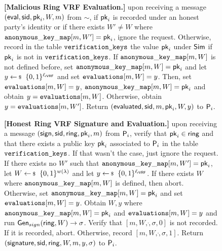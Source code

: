 \begin{figure}
\begin{tcolorbox}[left=2pt,right=2pt]
{			\textbf{[Malicious Ring VRF Evaluation.]} upon receiving a message $(\mathsf{eval}, \textsf{sid}, \mathsf{pk}_i, W, m)$ from $\sim$, if $ \mathsf{pk}_i $ is recorded under an honest party's identity or if there exists $ W'\neq W $ where $ \mathtt{anonymous\_key\_map}[m,W'] = \mathsf{pk}_i $, ignore the request.
			Otherwise, record in the table $\texttt{verification\_keys}$ the value $\mathsf{pk}_i$ under $\mathsf{Sim}$ if $ \mathsf{pk}_i $ is not in $ \texttt{verification\_keys} $. If  $\mathtt{anonymous\_key\_map}[m,W]  $ is not defined before, set $ \mathtt{anonymous\_key\_map}[m,W] = \mathsf{pk}_i $ and let   $y \leftsample \bin^{\ell_\rVRF}$ and set $ \texttt{evaluations}[m, W] = y$.
			Then, set $ \texttt{evaluations}[m, W] = y$, $ \mathtt{anonymous\_key\_map}[m,W] = \mathsf{pk}_i $ and obtain $ y =  \texttt{evaluations}[m, W]$. Otherwise, obtain $ y = \texttt{evaluations}[m, W'] $.
			Return $(\mathsf{evaluated}, \textsf{sid},  m, \mathsf{pk}_i,W, y)$ to $ \mathsf{P}_i $.

				
			\textbf{[Honest Ring VRF Signature and Evaluation.]} upon receiving a message $(\mathsf{sign}, \textsf{sid}, \mathsf{ring}, \mathsf{pk}_i, m)$ from $\mathsf{P}_i$, verify that $\mathsf{pk}_i \in \mathsf{ring}$ and that there exists a public key $\mathsf{pk}_i$ associated to $\mathsf{P}_i$ in the table $ \texttt{verification\_keys} $. If that wasn't the case, just ignore the request. 	
			If there exists no $ W' $ such that $ \mathtt{anonymous\_key\_map}[m,W'] =  \mathsf{pk}_i $, let $ W \leftsample \{0,1\}^{w(\secparam)}$ and let $y \leftsample \bin^{\ell_\rVRF}$. If there exists $ W $ where $ \mathtt{anonymous\_key\_map}[m,W] $ is defined, then abort. Otherwise, set $ \mathtt{anonymous\_key\_map}[m,W] = \mathsf{pk}_i $ and set $ \texttt{evaluations}[m, W] = y$.
			Obtain $ W, y $ where $ \mathtt{anonymous\_key\_map}[m,W] =\mathsf{pk}_i $ and $ \texttt{evaluations}[m, W] = y$  and run  $ \mathsf{Gen}_{sign}(\mathsf{ring}, W) \rightarrow \sigma $. Verify that $ [m, W,\ring, \sigma, 0] $ is not recorded. If it is recorded, abort. Otherwise, record $ [m, W, \ring,\sigma, 1] $. Return $(\mathsf{signature}, \textsf{sid}, \mathsf{ring},W,m, y, \sigma)$ to $\mathsf{P}_i$.
			
}
\end{tcolorbox}
\end{figure}
